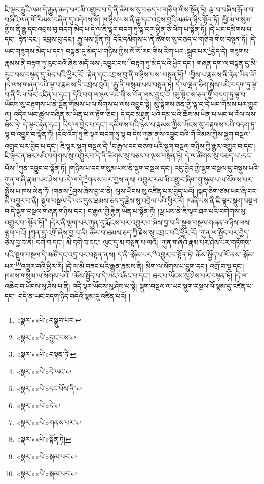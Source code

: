 ཇི་ལྟར་རྒྱུའི་ལམ་དེ་རྒྱུན་ཆད་པར་མི་འགྱུར་བ་དེ་ནི་ཚིགས་སུ་བཅད་པ་གཅིག་གིས་སྟོན་ཏེ། རྩ་བ་བཞིས་རྒོལ་བ་བཞིའི་ལན་གོ་རིམས་བཞིན་དུ་འདེབས་སོ། །གཉིས་པས་ནི་རྒྱུ་དང་འབྲས་བུའི་མཚན་ཉིད་སྟོན་ཏོ། །ཕྱི་མ་གསུམ་གྱིས་ནི་རྒྱུ་དང་འབྲས་བུ་བདག་མེད་པ་དེ་ལ་ཇི་ལྟར་བདག་ཏུ་ལྟ་བར་ཕྱིན་ཅི་ལོག་པ་སྟོན་ཏོ། །དེ་ཡང་དམིགས་པ་དང་། རྟེན་དང་། འབྲས་བུ་དང་། རྒྱུ་ལས་སྟོན་ཏེ། དེའི་དམིགས་པ་ནི་ཚིགས་སུ་བཅད་པ་གཅིག་གིས་བསྟན་ཏོ། །དེ་ཡང་གཟུགས་མེད་པ་དང་། བསྟན་དུ་མེད་པ་གཉིས་ཀྱིས་སོ་སོ་རང་གིས་རིག་པར་:སྒྲུབ་པར་\footnote{«སྣར་»«པེ་»བསྒྲུབ་པར་}བྱེད་དེ། གཟུགས་རྣམས་ནི་བརྟག་ཏུ་རུང་བའོ་ཞེས་མདོ་ལས་:འབྱུང་བས་\footnote{«སྣར་»«པེ་»བྱུང་བས་}བརྟག་ཏུ་མེད་པའི་ཕྱིར་དང་། གཞན་དག་ལ་བསྟན་དུ་མི་རུང་བས་བསྟན་དུ་མེད་པའི་ཕྱིར་རོ། །རྟེན་དང་འབྲས་བུ་ནི་གཉིས་པས་:བསྟན་ཏོ།\footnote{«སྣར་»«པེ་»བསྟན་ཏེ།} །བྱིས་པ་རྣམས་ནི་རྟེན་ཡིན་ནོ། །དེ་ལས་གཞན་པའི་ལྟ་བ་རྣམས་ནི་འབྲས་བུའོ། །རྒྱུ་ནི་གསུམ་པས་བསྟན་ཏེ། དེ་ལ་ལྷན་ཅིག་སྐྱེས་པའི་བདག་ཏུ་ལྟ་བ་ནི་རིལ་པོར་འཛིན་པ་དང་། དེའི་བག་ལ་ཉལ་རང་གི་ས་བོན་ལས་བྱུང་ངོ། །མུ་སྟེགས་ཅན་གྱི་བདག་ཏུ་ལྟ་བ་ཡོངས་སུ་བརྟགས་པ་ནི་སྔོན་གོམས་པ་ལ་སོགས་པ་ལས་འབྱུང་སྟེ། མུ་སྟེགས་ཅན་གྱི་ལྟ་བ་དེ་ཡང་གོམས་པར་གྱུར་ལ། འདིར་ཡང་ཚུལ་བཞིན་མ་ཡིན་པ་ལ་རྟོག་ཅིང་། དེ་དང་མཐུན་པའི་དམ་པའི་ཆོས་མ་ཡིན་པ་ཡང་ཕ་རོལ་ལས་ཐོས་ཏེ། དེ་ལྟར་རྟེན་དང་། ཡིད་ལ་བྱེད་པ་དང་། དམིགས་པའི་ཉེས་པ་རྣམས་ཀྱིས་ཡོངས་སུ་བརྟགས་པའི་བདག་ཏུ་ལྟ་བ་འབྱུང་བ་སྟོན་ཏོ། །དེའི་འོག་ཏུ་ཇི་ལྟར་བདག་ཏུ་ལྟ་བ་དེས་ཀུན་ནས་འབྱུང་བའི་གོ་རིམས་ཀྱིས་སྡུག་བསྔལ་འགྲུབ་པར་བྱེད་པ་དང་། ཇི་ལྟར་སྡུག་བསྔལ་དེ་\footnote{«སྣར་»«པེ་»དེ་ཡང་}ང་རྒྱལ་དང་བཅས་པའི་སྡུག་བསྔལ་གཉིས་ཀྱི་རྒྱུར་འགྱུར་བ་དང་། ཇི་ལྟར་ན་ཐར་པའི་བགེགས་སུ་འགྱུར་བ་དེ་ནི་ཚིགས་སུ་བཅད་པ་ལྔས་བསྟན་ཏེ། དེ་ལ་ཚིགས་སུ་བཅད་པ་:དང་པོས་\footnote{«སྣར་»«པེ་»དང་པོས་ནི་}ཀུན་འབྱུང་བ་སྟོན་ཏོ། །གཉིས་པ་དང་གསུམ་པས་ནི་སྡུག་བསྔལ་དང་། འདུ་བྱེད་ཀྱི་སྡུག་བསྔལ་དུ་བསྡུས་པའི་ཀུན་གཞི་རྣམ་པར་ཤེས་པ་:དེ་ལ་དེ་\footnote{«སྣར་»«པེ་»དེ་}གནས་པར་བྱས་ནས། འགྱུར་རམ་མི་འགྱུར་ཞིག་གུ་སྙམ་པ་ལ་སོགས་པར་སྤྲོས་པ་ཁས་ལེན་ཏོ། །གནས་\footnote{«སྣར་»«པེ་»གནས་པར་}བྱས་ཞེས་བྱ་བ་ནི། ལུས་ཡོངས་སུ་འཛིན་པར་བྱེད་པའོ། །སྐད་ཅིག་ཙམ་ཡང་ཞི་བར་མི་འགྱུར་བ་ནི། སྡུག་བསྔལ་དེ་ཡང་དུས་ཐམས་ཅད་དུ་རྗེས་སུ་འབྲེལ་པའི་ཕྱིར་རོ། །བཞི་པས་ནི་ཇི་ལྟར་སྡུག་བསྔལ་བ་དེ་སྡུག་བསྔལ་གཞན་གཉིས་དང་། ང་རྒྱལ་གྱི་རྐྱེན་ཡིན་པ་སྟོན་ཏོ། །ལྔ་པས་ནི་ཇི་ལྟར་ཐར་པའི་བགེགས་སུ་འགྱུར་བ་:སྟོན་ཏོ།\footnote{«སྣར་»«པེ་»སྟོན་ཏེ།} །དེར་ནི་ལྷག་པར་ཀུན་དུ་རྨོངས་པར་འགྱུར་བ་ཞེས་བྱ་བ་ནི་སྡུག་བསྔལ་གཞན་གཉིས་ལས་ལྷག་པའོ། །ཀུན་དུ་འགྲོ་ཞེས་བྱ་བ་ནི། ཚོར་བ་ཐམས་ཅད་ཀྱི་རྗེས་སུ་འབྲང་བའི་ཕྱིར་རོ། །ཀུན་ལ་སྤྱོད་པར་བྱེད་ཅེས་བྱ་བ་ནི། དགེ་བ་དང་། མི་དགེ་བ་དང་། ལུང་དུ་མ་བསྟན་པ་ལའོ། །ཀུན་གཞིའི་རྣམ་པར་ཤེས་པར་གཏོགས་པའི་སྡུག་བསྔལ་དེ་མཚོ་དང་འདྲ་བར་བསྟན་ནས། ད་ནི་:སྐོམ་པར་\footnote{«སྣར་»«པེ་»སྐམ་པར་}འགྱུར་བ་སྟོན་ཏེ། ཆོས་སྤྱོད་པ་ཁོ་ནས་:སྐོམ་པར་\footnote{«སྣར་»«པེ་»སྐམ་པར་}འགྱུར་བའི་ཕྱིར་རོ། །དེ་ལ་མི་བཟད་པའི་རྒྱུན་རྣམས་ནི། མིག་ལ་སོགས་པ་དྲུག་དང་། འགྲོ་བ་ལྔ་དང་། ཁམས་གསུམ་ལ་སོགས་པའོ། །ཆོས་སྤྱོད་པ་དེ་ཡང་འཆིང་བ་དང་། ཐར་པ་ཡོངས་སུ་ཤེས་པར་བསྟན་ཏོ། །དེ་ལ་འཆིང་བ་ཡོངས་སུ་ཤེས་པ་ནི། འདི་ལྟར་ཡོངས་སུ་ཤེས་པ་སྟེ། སྡུག་བསྔལ་ལ་ཡང་སྡུག་བསྔལ་ལོ་སྙམ་དུ་འཛིན་པ་དང་། བདེ་ན་ཡང་བདག་ཉིད་བདེའོ་སྙམ་དུ་འཛིན་པའོ། །
